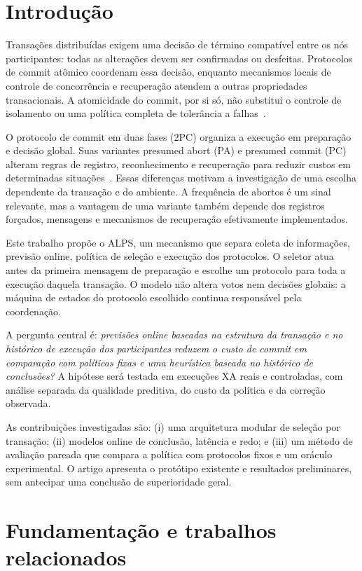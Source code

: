 \documentclass[12pt,a4paper]{article}
\begin{document}
\section{Introdução}
Transações distribuídas exigem uma decisão de término compatível entre os nós participantes: todas as alterações devem ser confirmadas ou desfeitas. Protocolos de commit atômico coordenam essa decisão, enquanto mecanismos locais de controle de concorrência e recuperação atendem a outras propriedades transacionais. A atomicidade do commit, por si só, não substitui o controle de isolamento ou uma política completa de tolerância a falhas~\cite{ozsu2019,gray2006}.

O protocolo de commit em duas fases (2PC) organiza a execução em preparação e decisão global. Suas variantes presumed abort (PA) e presumed commit (PC) alteram regras de registro, reconhecimento e recuperação para reduzir custos em determinadas situações~\cite{mohan1986,lampson1993}. Essas diferenças motivam a investigação de uma escolha dependente da transação e do ambiente. A frequência de abortos é um sinal relevante, mas a vantagem de uma variante também depende dos registros forçados, mensagens e mecanismos de recuperação efetivamente implementados.

Este trabalho propõe o ALPS, um mecanismo que separa coleta de informações, previsão online, política de seleção e execução dos protocolos. O seletor atua antes da primeira mensagem de preparação e escolhe um protocolo para toda a execução daquela transação. O modelo não altera votos nem decisões globais: a máquina de estados do protocolo escolhido continua responsável pela coordenação.

A pergunta central é: \textit{previsões online baseadas na estrutura da transação e no histórico de execução dos participantes reduzem o custo de commit em comparação com políticas fixas e uma heurística baseada no histórico de conclusões?} A hipótese será testada em execuções XA reais e controladas, com análise separada da qualidade preditiva, do custo da política e da correção observada.

As contribuições investigadas são: (i) uma arquitetura modular de seleção por transação; (ii) modelos online de conclusão, latência e redo; e (iii) um método de avaliação pareada que compara a política com protocolos fixos e um oráculo experimental. O artigo apresenta o protótipo existente e resultados preliminares, sem antecipar uma conclusão de superioridade geral.

\section{Fundamentação e trabalhos relacionados}
\end{document}
